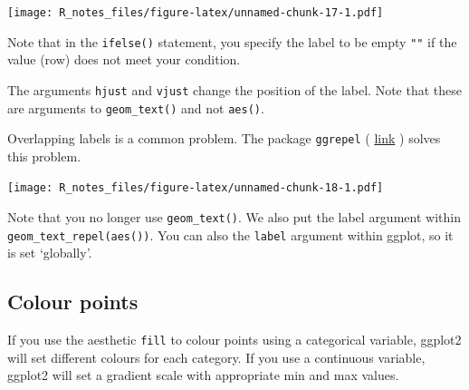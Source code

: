 \documentclass[]{book}
\newenvironment{Shaded}{\begin{snugshade}}{\end{snugshade}}
\newcommand{\KeywordTok}[1]{\textcolor[rgb]{0.13,0.29,0.53}{\textbf{#1}}}
\newcommand{\DataTypeTok}[1]{\textcolor[rgb]{0.13,0.29,0.53}{#1}}
\newcommand{\FloatTok}[1]{\textcolor[rgb]{0.00,0.00,0.81}{#1}}
\newcommand{\StringTok}[1]{\textcolor[rgb]{0.31,0.60,0.02}{#1}}
\newcommand{\OperatorTok}[1]{\textcolor[rgb]{0.81,0.36,0.00}{\textbf{#1}}}
\newcommand{\NormalTok}[1]{#1}
\begin{document}
\texttt{[image: R\_notes\_files/figure-latex/unnamed-chunk-17-1.pdf]}

Note that in the \texttt{ifelse()} statement, you specify the label to
be empty \texttt{""} if the value (row) does not meet your condition.

The arguments \texttt{hjust} and \texttt{vjust} change the position of
the label. Note that these are arguments to \texttt{geom\_text()} and
not \texttt{aes()}.

Overlapping labels is a common problem. The package \texttt{ggrepel} (
\href{https://cran.r-project.org/web/packages/ggrepel/vignettes/ggrepel.html}{link}
) solves this problem.

\begin{Shaded}
\end{Shaded}

\texttt{[image: R\_notes\_files/figure-latex/unnamed-chunk-18-1.pdf]}

Note that you no longer use \texttt{geom\_text()}. We also put the label
argument within \texttt{geom\_text\_repel(aes())}. You can also the
\texttt{label} argument within ggplot, so it is set `globally'.

\subsection{Colour points}\label{colour-points}

If you use the aesthetic \texttt{fill} to colour points using a
categorical variable, ggplot2 will set different colours for each
category. If you use a continuous variable, ggplot2 will set a gradient
scale with appropriate min and max values.
\end{document}
